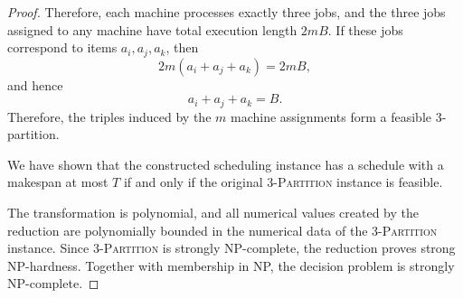 \documentclass[10pt,a4paper]{amsart}
\begin{document}
\begin{proof}
Therefore, each machine processes exactly three jobs, and the three jobs assigned
to any machine have total execution length \(2mB\). If these jobs correspond to
items \(a_i,a_j,a_k\), then
\[
        2m(a_i+a_j+a_k)=2mB,
\]
and hence
\[
        a_i+a_j+a_k=B.
\]
Therefore, the triples induced by the \(m\) machine assignments form a feasible
3-partition.

We have shown that the constructed scheduling instance has a schedule with a 
makespan at most \(T\) if and only if the original \textsc{3-Partition} instance
is feasible.

The transformation is polynomial, and all numerical values created by the
reduction are polynomially bounded in the numerical data of the
\textsc{3-Partition} instance. Since \textsc{3-Partition} is strongly
NP-complete, the reduction proves strong NP-hardness. Together with membership
in NP, the decision problem is strongly NP-complete.
\end{proof}
\end{document}
